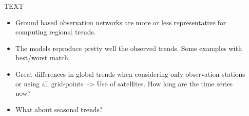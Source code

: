 \documentclass[journal abbreviation, manuscript]{copernicus}
\begin{document}
\conclusions  %
TEXT
\begin{itemize}
 \item Ground based observation networks are more or less representative for computing regional trends.
 \item The models reproduce pretty well the observed trends. Some examples with best/worst match.
 \item Great differences in global trends when considering only observation stations or using all grid-points --> Use of satellites. How long are the time series now?
 \item What about seasonal trends?
\end{itemize}













\appendix
\section{}    %

\subsection{}     %


\noappendix       %


\end{document}
